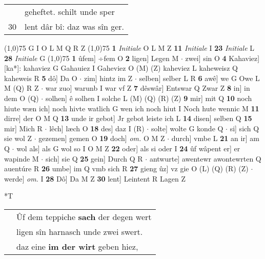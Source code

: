 \documentclass[8pt,a4paper,notitlepage]{article}
\begin{document}
\begin{table}[ht]
\begin{minipage}[t]{0.5\linewidth}
\begin{tabular}{rl}
 & geheftet. schilt unde sper\\ 
30 & lent dâr bî: daz was sîn ger.\\ 
\end{tabular}
\scriptsize
\line(1,0){75} \newline
G I O L M Q R Z \newline
\line(1,0){75} \newline
\textbf{1} \textit{Initiale} O L M Z  \textbf{11} \textit{Initiale} I  \textbf{23} \textit{Initiale} L  \textbf{28} \textit{Initiale} G  \newline
\line(1,0){75} \newline
\textbf{1} ûfem] ÷fem O \textbf{2} ligen] Legen M  $\cdot$ zwei] sin O \textbf{4} Kahaviez] [ka*]: kahaviez G Gahauiez I Gaheviez O (M) (Z) kaheviez L kaheweisz Q kaheweis R \textbf{5} dô] Da O  $\cdot$ zim] hintz im Z  $\cdot$ selben] selber L R \textbf{6} awê] we G Owe L M (Q) R Z  $\cdot$ war zuo] warunb I war vf Z \textbf{7} dêswâr] Entswar Q Zwar Z \textbf{8} in] in dem O (Q)  $\cdot$ solhen] ê solhen I solche L (M) (Q) (R) (Z) \textbf{9} mir] mit Q \textbf{10} noch hiute wæn ich] noch hivte watlich G wen ich noch hiut I Noch hute wennic M \textbf{11} dirre] der O M Q \textbf{13} unde ir gebot] Jr gebot leiste ich L \textbf{14} disen] selben Q \textbf{15} mir] Mich R  $\cdot$ lêch] læch O \textbf{18} des] daz I (R)  $\cdot$ solte] wolte G konde Q  $\cdot$ si] sich Q sie wol Z  $\cdot$ gezemen] gemen O \textbf{19} doch] \textit{om.} O M Z  $\cdot$ durch] vmbe L \textbf{21} an ir] am Q  $\cdot$ wol als] als G wol so I O M Z \textbf{22} oder] als si oder I \textbf{24} ûf wâpent er] er wapinde M  $\cdot$ sich] sie Q \textbf{25} gein] Durch Q R  $\cdot$ antwurte] awentewr awontewrten Q auentúre R \textbf{26} umbe] im Q vmb sich R \textbf{27} gieng ûz] vz gie O (L) (Q) (R) (Z)  $\cdot$ werde] \textit{om.} I \textbf{28} Dô] Da M Z \textbf{30} lent] Leintent R Lagen Z \newline
\end{minipage}
\hspace{0.5cm}
\begin{minipage}[t]{0.5\linewidth}
\small
\begin{center}*T
\end{center}
\begin{tabular}{rl}
 & Ûf dem teppiche \textbf{sach} der degen wert\\ 
 & ligen sîn harnasch unde zwei swert.\\ 
 & daz eine \textbf{im der wirt} geben hiez,\\ 

\end{tabular}
\end{minipage}
\end{table}
\end{document}
